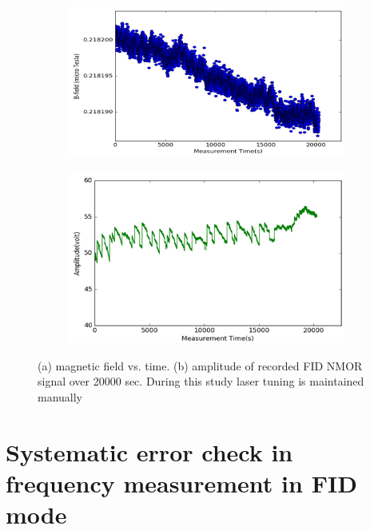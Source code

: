    \begin{figure}
    \centering
 
    \begin{subfigure}[b]{0.45\textwidth}
        \centering
        \includegraphics[width=\textwidth]{figures/manual_tuning}
        \caption{}
        \label{fig:field manual tuning}
    \end{subfigure}
    \hfill
    \begin{subfigure}[b]{0.45\textwidth}
        \centering
        \includegraphics[width=\textwidth]{figures/amplitude_manual_tuning}
        \caption{}
        \label{fig:amplitude manual tuning}
    \end{subfigure}
    \caption{(a) magnetic field vs. time. (b) amplitude of recorded FID NMOR signal over 20000 sec. During this study laser tuning is maintained manually}
    \label{fig:manual tuning}
\end{figure}
\section{Systematic error check in frequency measurement in FID mode \label{sec:reference-frequency}} 
